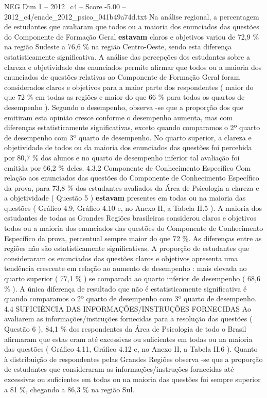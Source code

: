 \begin{textsample}{NEG Dim 1 – 2012\_c4 – Score -5.00 – 2012\_c4/enade\_2012\_psico\_041b49a74d.txt}
Na análise regional, a percentagem de estudantes que avaliaram que todos ou a maioria dos enunciados das questões do Componente de Formação Geral \textbf{estavam} claros e objetivos variou de 72,9 \% na região Sudeste a 76,6 \% na região Centro-Oeste, sendo esta diferença estatisticamente significativa.
A análise das percepções dos estudantes sobre a clareza e objetividade dos enunciados permite afirmar que todos ou a maioria dos enunciados de questões relativas ao Componente de Formação Geral foram considerados claros e objetivos para a maior parte dos respondentes ( maior do que 72 \% em todas as regiões e maior do que 66 \% para todos os quartos de desempenho ).
Segundo o desempenho, observa -se que a proporção dos que emitiram esta opinião cresce conforme o desempenho aumenta, mas com diferenças estatisticamente significativas, exceto quando comparamos o 2º quarto de desempenho com 3º quarto de desempenho.
No quarto superior, a clareza e objetividade de todos ou da maioria dos enunciados das questões foi percebida por 80,7 \% dos alunos e no quarto de desempenho inferior tal avaliação foi emitida por 66,2 \% deles. 4.3.2 Componente de Conhecimento Específico Com relação aos enunciados das questões do Componente de Conhecimento Específico da prova, para 73,8 \% dos estudantes avaliados da Área de Psicologia a clareza e a objetividade ( Questão 5 ) \textbf{estavam} presentes em todas ou na maioria das questões ( Gráfico 4.9, Gráfico 4.10 e, no Anexo II, a Tabela II.5 ).
A maioria dos estudantes de todas as Grandes Regiões brasileiras considerou claros e objetivos todos ou a maioria dos enunciados das questões do Componente de Conhecimento Específico da prova, percentual sempre maior do que 72 \%.
As diferenças entre as regiões não são estatisticamente significativas.
A proporção de estudantes que consideraram os enunciados das questões claros e objetivos apresenta uma tendência crescente em relação ao aumento de desempenho : mais elevada no quarto superior ( 77,1 \% ) se comparada ao quarto inferior de desempenho ( 68,6 \% ).
A única diferença de resultado que não é estatisticamente significativa é quando comparamos o 2º quarto de desempenho com 3º quarto de desempenho. 4.4 SUFICIÊNCIA DAS INFORMAÇÕES/INSTRUÇÕES FORNECIDAS Ao avaliarem as informações/instruções fornecidas para a resolução das questões ( Questão 6 ), 84,1 \% dos respondentes da Área de Psicologia de todo o Brasil afirmaram que estas eram até excessivas ou suficientes em todas ou na maioria das questões ( Gráfico 4.11, Gráfico 4.12 e, no Anexo II, a Tabela II.6 ).
Quanto à distribuição de respondentes pelas Grandes Regiões observa -se que a proporção de estudantes que consideraram as informações/instruções fornecidas até excessivas ou suficientes em todas ou na maioria das questões foi sempre superior a 81 \%, chegando a 86,3 \% na região Sul.

\end{textsample}
